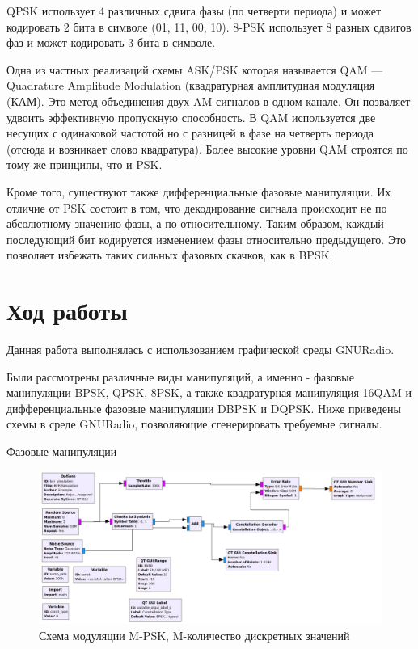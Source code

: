 	QPSK использует 4 различных сдвига фазы (по четверти периода) и может кодировать 2 бита в символе (01, 11, 00, 10). 8-PSK использует 8 разных сдвигов фаз и может кодировать 3 бита в символе. 
	
	Одна из частных реализаций схемы ASK/PSK которая называется QAM — Quadrature Amplitude Modulation (квадратурная амплитудная модуляция (КАМ). Это метод объединения двух AM-сигналов в одном канале. Он позваляет удвоить эффективную пропускную способность. В QAM используется две несущих с одинаковой частотой но с разницей в фазе на четверть периода (отсюда и возникает слово квадратура). Более высокие уровни QAM строятся по тому же принципы, что и PSK.
	
	Кроме того, существуют также дифференциальные фазовые манипуляции. Их отличие от PSK состоит в том, что декодирование сигнала происходит не по абсолютному значению фазы, а по относительному. Таким образом, каждый последующий бит кодируется изменением фазы относительно предыдущего. Это позволяет избежать таких сильных фазовых скачков, как в BPSK.

	\newpage
	\section{Ход работы}
	Данная работа выполнялась с использованием графической среды GNURadio.
	\par
	Были рассмотрены различные виды манипуляций, а именно - фазовые манипуляции BPSK, QPSK, 8PSK, а также квадратурная манипуляция 16QAM и дифференциальные фазовые манипуляции DBPSK и DQPSK. Ниже приведены схемы в среде GNURadio, позволяющие сгенерировать требуемые сигналы.
	\par
	\begin{center}
		\large {Фазовые манипуляции}
	\end{center}
		\begin{figure}[H]
		\begin{center}
			\includegraphics[scale=0.35]{../pks_graph.jpg}
			\caption{Схема модуляции M-PSK, M-количество дискретных значений} 
		\end{center}
	\end{figure}


